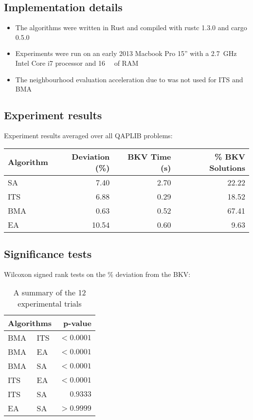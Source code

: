 \subsection{Implementation details} {
    \begin{itemize}
        \item The algorithms were written in Rust and compiled with rustc 1.3.0 and cargo 0.5.0
        \item Experiments were run on an early 2013 Macbook Pro 15'' with a \SI{2.7}{\giga\hertz} Intel Core i7 processor and \SI{16}{\giga\byte} of RAM
        \item The neighbourhood evaluation acceleration due to \citet{Frieze:1989iv} was not used for ITS and BMA
    \end{itemize}
}

\subsection{Experiment results} {

    Experiment results averaged over all QAPLIB problems:

    \begin{tabularx}{1.0\textwidth}{@{}l|rrr@{}}
        \toprule
        Algorithm & Deviation (\%) & BKV Time (s) & \% BKV Solutions \\
        \midrule
        SA  &  7.40 & 2.70 & 22.22 \\
        ITS &  6.88 & 0.29 & 18.52 \\
        BMA &  0.63 & 0.52 & 67.41 \\
        EA  & 10.54 & 0.60 &  9.63 \\
        \bottomrule
    \end{tabularx}

}

\subsection{Significance tests} {
    Wilcoxon signed rank tests on the \% deviation from the BKV:

    \begin{table}
        \centering
        \caption{A summary of the 12 experimental trials}
        \label{tab:training_schemes}
        \begin{tabularx}{1.0\textwidth}{@{}ll|r@{}}
            \toprule
            \multicolumn{2}{c}{Algorithms} & p-value \\
            \midrule
            BMA & ITS & \(<0.0001\) \\
            BMA & EA  & \(<0.0001\) \\
            BMA & SA  & \(<0.0001\) \\
            ITS & EA  & \(<0.0001\) \\
            ITS & SA  & \(0.9333\) \\
            EA  & SA  & \(>0.9999\) \\
            \bottomrule
        \end{tabularx}
    \end{table}
}

